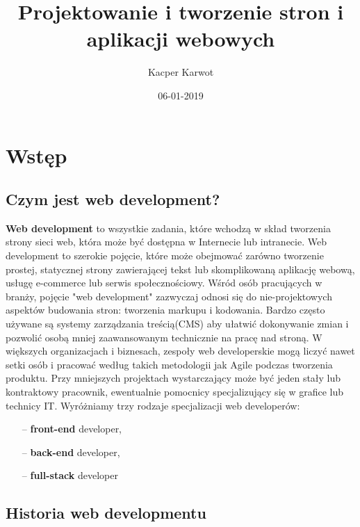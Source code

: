 \documentclass[12pt]{report}
\title{Projektowanie i tworzenie stron i aplikacji webowych}
\date{06-01-2019}
\author{Kacper Karwot}
\begin{document}
	\maketitle
	\tableofcontents
	\newpage
	\chapter{Wstęp}
	\section{Czym jest web development?}
	\textbf{Web development} to wszystkie zadania, które wchodzą w skład tworzenia strony sieci web, która może być dostępna w Internecie lub intranecie. 
	Web development to szerokie pojęcie, które może obejmować zarówno tworzenie prostej, statycznej strony zawierającej tekst lub 			skomplikowaną aplikację webową, usługę e-commerce lub serwis społecznościowy. 
 Wśród osób pracujących w branży, pojęcie "web development" zazwyczaj odnosi się do nie-projektowych aspektów budowania stron: tworzenia markupu i kodowania. Bardzo często używane są systemy zarządzania treścią(CMS) aby ułatwić dokonywanie zmian i pozwolić osobą mniej zaawansowanym technicznie na pracę nad stroną.
 	\newline
 	W większych organizacjach i biznesach, zespoły web developerskie mogą liczyć nawet setki osób i pracować według takich metodologii jak Agile podczas tworzenia produktu. Przy mniejszych projektach wystarczający może być jeden stały lub kontraktowy pracownik, ewentualnie pomocnicy specjalizujący się w grafice lub technicy IT. 
	\newline
	Wyróżniamy trzy rodzaje specjalizacji web developerów:
	\begin{itemize}
	\item[--] \textbf{front-end} developer,
	\item[--] \textbf{back-end} developer,
	\item[--] \textbf{full-stack} developer
 	\end{itemize}
 	
 	\cite{wiki:1}
 	
 	\newpage
	\section{Historia web developmentu}
	
\end{document}
